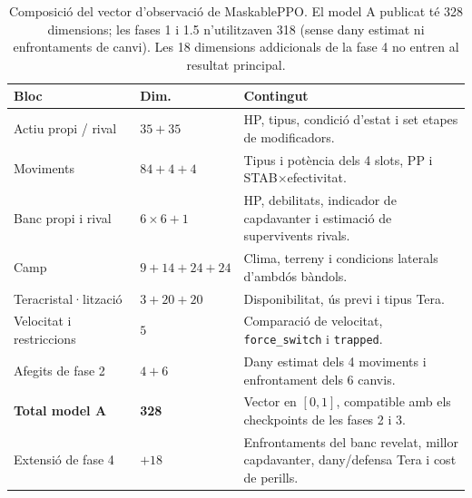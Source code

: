 \begin{table}[htbp]
\centering
\caption{Composició del vector d'observació de MaskablePPO. El model A publicat té 328 dimensions; les fases 1 i 1.5 n'utilitzaven 318 (sense dany estimat ni enfrontaments de canvi). Les 18 dimensions addicionals de la fase 4 no entren al resultat principal.}
\label{tab:ppo_obs_layout}
\small
\begin{tabularx}{\textwidth}{l>{\raggedright\arraybackslash}p{1.6cm}>{\raggedright\arraybackslash}X}
\toprule
\textbf{Bloc} & \textbf{Dim.} & \textbf{Contingut} \\
\midrule
Actiu propi / rival & $35+35$ & HP, tipus, condició d'estat i set etapes de modificadors. \\
Moviments & $84+4+4$ & Tipus i potència dels 4 slots, PP i STAB$\times$efectivitat. \\
Banc propi i rival & $6\times 6+1$ & HP, debilitats, indicador de capdavanter i estimació de supervivents rivals. \\
Camp & $9+14+24+24$ & Clima, terreny i condicions laterals d'ambdós bàndols. \\
Teracristal·lització & $3+20+20$ & Disponibilitat, ús previ i tipus Tera. \\
Velocitat i restriccions & $5$ & Comparació de velocitat, \texttt{force\_switch} i \texttt{trapped}. \\
Afegits de fase 2 & $4+6$ & Dany estimat dels 4 moviments i enfrontament dels 6 canvis. \\
\midrule
\textbf{Total model A} & \textbf{328} & Vector en $[0,1]$, compatible amb els checkpoints de les fases 2 i 3. \\
Extensió de fase 4 & $+18$ & Enfrontaments del banc revelat, millor capdavanter, dany/defensa Tera i cost de perills. \\
\bottomrule
\end{tabularx}
\end{table}
